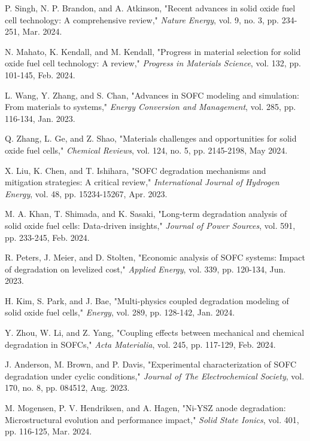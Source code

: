 \documentclass[conference]{IEEEtran}
\begin{document}
\begin{thebibliography}{99}

P. Singh, N. P. Brandon, and A. Atkinson, "Recent advances in solid oxide fuel cell technology: A comprehensive review," \textit{Nature Energy}, vol. 9, no. 3, pp. 234-251, Mar. 2024.

N. Mahato, K. Kendall, and M. Kendall, "Progress in material selection for solid oxide fuel cell technology: A review," \textit{Progress in Materials Science}, vol. 132, pp. 101-145, Feb. 2024.

L. Wang, Y. Zhang, and S. Chan, "Advances in SOFC modeling and simulation: From materials to systems," \textit{Energy Conversion and Management}, vol. 285, pp. 116-134, Jan. 2023.

Q. Zhang, L. Ge, and Z. Shao, "Materials challenges and opportunities for solid oxide fuel cells," \textit{Chemical Reviews}, vol. 124, no. 5, pp. 2145-2198, May 2024.

X. Liu, K. Chen, and T. Ishihara, "SOFC degradation mechanisms and mitigation strategies: A critical review," \textit{International Journal of Hydrogen Energy}, vol. 48, pp. 15234-15267, Apr. 2023.

M. A. Khan, T. Shimada, and K. Sasaki, "Long-term degradation analysis of solid oxide fuel cells: Data-driven insights," \textit{Journal of Power Sources}, vol. 591, pp. 233-245, Feb. 2024.

R. Peters, J. Meier, and D. Stolten, "Economic analysis of SOFC systems: Impact of degradation on levelized cost," \textit{Applied Energy}, vol. 339, pp. 120-134, Jun. 2023.

H. Kim, S. Park, and J. Bae, "Multi-physics coupled degradation modeling of solid oxide fuel cells," \textit{Energy}, vol. 289, pp. 128-142, Jan. 2024.

Y. Zhou, W. Li, and Z. Yang, "Coupling effects between mechanical and chemical degradation in SOFCs," \textit{Acta Materialia}, vol. 245, pp. 117-129, Feb. 2024.

J. Anderson, M. Brown, and P. Davis, "Experimental characterization of SOFC degradation under cyclic conditions," \textit{Journal of The Electrochemical Society}, vol. 170, no. 8, pp. 084512, Aug. 2023.

M. Mogensen, P. V. Hendriksen, and A. Hagen, "Ni-YSZ anode degradation: Microstructural evolution and performance impact," \textit{Solid State Ionics}, vol. 401, pp. 116-125, Mar. 2024.


\end{thebibliography}
\end{document}
